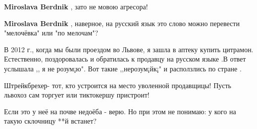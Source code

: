 \begin{itemize}
\begin{itemize}
 
\textbf{Miroslava Berdnik} , зато не мовою агресора\Laughey[1.0][white]!

 
\textbf{Miroslava Berdnik} , наверное, на русский язык это слово можно перевести "мелочёвка" или "по мелочам"?
\end{itemize}

 

В 2012 г., когда мы были проездом во Львове, я зашла в аптеку купить цитрамон.
Естественно, поздоровалась и обратилась к продавцу на русском языке .В ответ
услышала ,, я не розум¡ю". Вот такие ,,нерозум¡йк¡" и расползлись по стране .


 
Штрейкбрехер- тот, кто устроится на место уволенной продавщицы! Пусть львохоз сам торгует или тиктокершу пристроит!

 
Если это у неё на почве недоёба - верю. Но при этом не понимаю: у кого на такую склочницу **й встанет?

 

\end{itemize}
